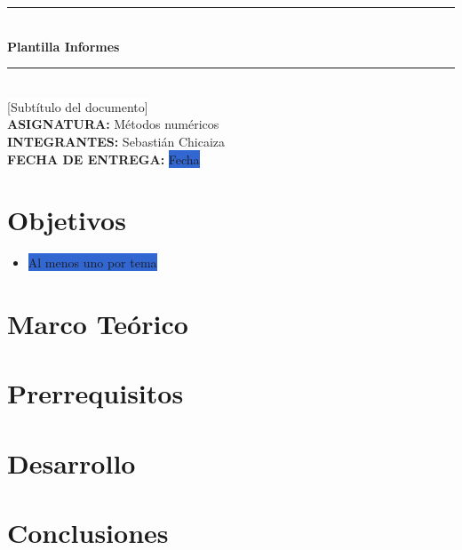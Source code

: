 \documentclass[12pt,a4paper]{report}
\begin{document}
\thispagestyle{empty}
\vspace*{2cm}
\begin{center}
    \noindent\rule{\textwidth}{0.4pt}\\[0.5cm]
    {\Huge\bfseries Plantilla Informes}\\[0.5cm]
    \noindent\rule{\textwidth}{0.4pt}\\[0.5cm]
    {\large {\colorbox{white}{[Subtítulo del documento]}}}\\[2cm]
    \textbf{ASIGNATURA:} \hspace{1cm} {Métodos numéricos}\\[0.2cm]
    
    \textbf{INTEGRANTES:} \hspace{1cm} {Sebastián Chicaiza}\\[2cm]
    
    \textbf{FECHA DE ENTREGA:} \hspace{0.5cm} \colorbox{highlight}{Fecha}
\end{center}
\newpage


\tableofcontents
\thispagestyle{empty}
\newpage

\setcounter{page}{1}

\section*{Objetivos} 
\begin{itemize}
    \item \colorbox{highlight}{Al menos uno por tema}
\end{itemize}

\section*{Marco Teórico}

\section*{Prerrequisitos}

\section*{Desarrollo}

\section*{Conclusiones}
\end{document}
